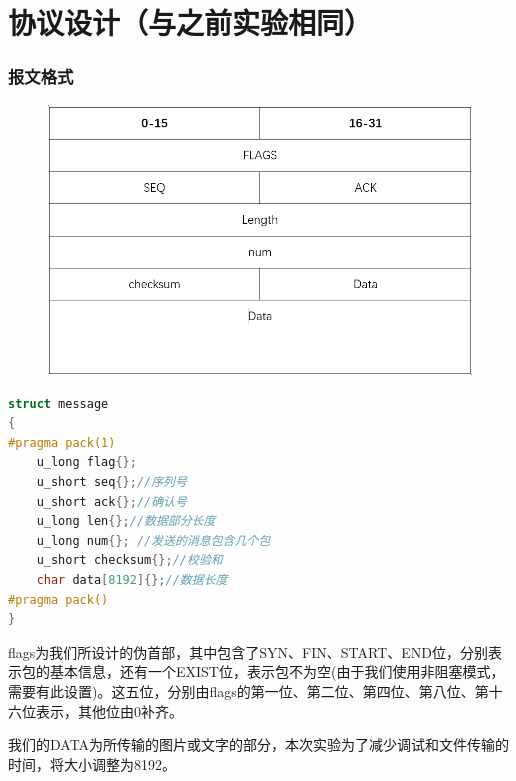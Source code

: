\documentclass[UTF8,a4paper,10pt]{ctexart}
\begin{document}
\section{协议设计（与之前实验相同）}
\subsubsection{报文格式}
\begin{figure}[H]
    \centering
    \includegraphics[scale=0.6]{计网1.png}
    \label{fig:1}
\end{figure}
\begin{lstlisting}[title=报文格式,frame=trbl,language={C++}]
struct message
{
#pragma pack(1)
    u_long flag{};
    u_short seq{};//序列号
    u_short ack{};//确认号
    u_long len{};//数据部分长度
    u_long num{}; //发送的消息包含几个包
    u_short checksum{};//校验和
    char data[8192]{};//数据长度
#pragma pack()
}
\end{lstlisting}
flags为我们所设计的伪首部，其中包含了SYN、FIN、START、END位，分别表示包的基本信息，还有一个EXIST位，表示包不为空(由于我们使用非阻塞模式，需要有此设置)。这五位，分别由flags的第一位、第二位、第四位、第八位、第十六位表示，其他位由0补齐。\par
我们的DATA为所传输的图片或文字的部分，本次实验为了减少调试和文件传输的时间，将大小调整为8192。
\end{document}
